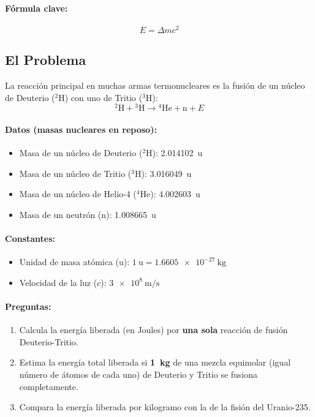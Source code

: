 \documentclass[11pt,a4paper]{book}
\begin{document}
\paragraph{Fórmula clave:}
\[ E = \Delta m c^2 \]

\subsection*{El Problema}
La reacción principal en muchas armas termonucleares es la fusión de un núcleo de Deuterio (${}^2\text{H}$) con uno de Tritio (${}^3\text{H}$):
\[ {}^2\text{H} + {}^3\text{H} \rightarrow {}^4\text{He} + \text{n} + E \]

\paragraph{Datos (masas nucleares en reposo):}
\begin{itemize}
    \item Masa de un núcleo de Deuterio (${}^2\text{H}$): \SI{2.014102}{\atomicmassunit}
    \item Masa de un núcleo de Tritio (${}^3\text{H}$): \SI{3.016049}{\atomicmassunit}
    \item Masa de un núcleo de Helio-4 (${}^4\text{He}$): \SI{4.002603}{\atomicmassunit}
    \item Masa de un neutrón (n): \SI{1.008665}{\atomicmassunit}
\end{itemize}

\paragraph{Constantes:}
\begin{itemize}
    \item Unidad de masa atómica (u): $\SI{1}{\atomicmassunit} = \SI{1.6605e-27}{\kilo\gram}$
    \item Velocidad de la luz ($c$): $\SI{3e8}{\meter\per\second}$
\end{itemize}

\paragraph{Preguntas:}
\begin{enumerate}
    \item Calcula la energía liberada (en Joules) por \textbf{una sola} reacción de fusión Deuterio-Tritio.
    \item Estima la energía total liberada si \textbf{\SI{1}{\kilo\gram}} de una mezcla equimolar (igual número de átomos de cada uno) de Deuterio y Tritio se fusiona completamente.
    \item Compara la energía liberada por kilogramo con la de la fisión del Uranio-235.
\end{enumerate}
\end{document}
